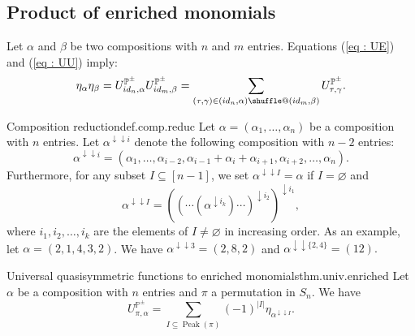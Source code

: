 \documentclass[numbers=enddot,12pt,final,onecolumn,notitlepage]{scrartcl}%
\makeatletter
\newcommand{\al}{\alpha}
\newcommand{\PP}{\mathbb{P}} %
\newcommand{\Peak}{\operatorname{Peak}}
\providecommand*{\shuffle}{%
  \mathbin{\mathpalette\shuffle@{}}%
}
\newcommand*{\shuffle@}[2]{%
  \sbox0{$#1\vcenter{}$}%
  \kern .15\ht0 %
  \rlap{\vrule height .25\ht0 depth 0pt width 2.5\ht0}%
  \raise.1\ht0\hbox to 2.5\ht0{%
    \vrule height 1.75\ht0 depth -.1\ht0 width .17\ht0 %
    \hfill
    \vrule height 1.75\ht0 depth -.1\ht0 width .17\ht0 %
    \hfill
    \vrule height 1.75\ht0 depth -.1\ht0 width .17\ht0 %
  }%
  \kern .15\ht0 %
}
\newcommand{\0}{\phantom{c}}
\let\sumnonlimits\sum
\renewcommand{\sum}{\sumnonlimits\limits}
\makeatother
\begin{document}
\subsection{Product of  enriched monomials}
Let $\alpha$ and $\beta$ be two compositions with $n$ and $m$ entries. Equations (\ref{eq : UE}) and (\ref{eq : UU}) imply:
\begin{align}
\label{eq : MME}
\eta_\al \eta_\beta = U^{\PP^\pm}_{id_{n},\alpha}U^{\PP^\pm}_{id_{m},\beta}=\sum_{(\tau,\gamma)\in(id_{n},\alpha)\shuffle(id_{m},\beta)}U^{\mathcal{\PP^\pm}}_{\tau,\gamma} .
\end{align}
\begin{definition}{Composition reduction}{def.comp.reduc}
Let $\al = (\al_1, \dots, \al_n)$ be a composition with $n$ entries. Let $\al^{\downarrow\downarrow i}$ denote the following composition with $n-2$ entries:
\begin{equation*}
\al^{\downarrow\downarrow i} = (\al_1, \dots, \al_{i-2},{\al_{i-1}+\al_i+\al_{i+1}},\al_{i+2},\dots ,\al_n) .
\end{equation*}  
Furthermore, for any subset $I\subseteq [n-1]$, we set $\al^{\downarrow\downarrow I}= \al$ if $I=\varnothing$ and
\[
\al^{\downarrow\downarrow I}
= \left( \left( \cdots \left( \al^{\downarrow i_k} \right) \cdots \right)^{\downarrow i_2} \right)^{\downarrow i_1} ,
\]
where $i_1, i_2, \ldots, i_k$ are the elements of $I \neq \varnothing$ in increasing order.
As an example, let $\al = (2,1,4,3,2)$. We have $\al^{\downarrow\downarrow 3} = (2,8,2)$ and $\al^{\downarrow \downarrow\{2,4\}} = (12).$

\end{definition}
%
\begin{theorem}{Universal quasisymmetric functions to enriched monomials}{thm.univ.enriched}
Let $\alpha$ be a composition with $n$ entries and $\pi$ a permutation in $S_n$. We have
\begin{equation}
\label{eq : U as sum}
U^{\PP^\pm}_{\pi,\al} = \sum_{I \subseteq \Peak(\pi)}(-1)^{|I|}\eta_{\al^{\downarrow\downarrow I}} .
\end{equation}
\end{theorem}
\end{document}

